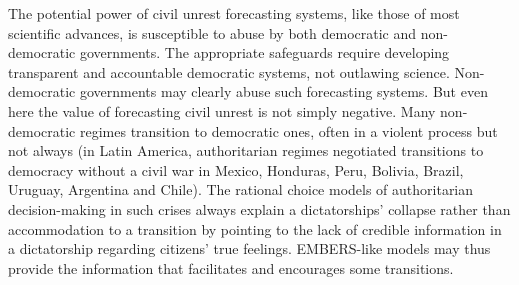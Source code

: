 The potential power of civil unrest forecasting systems, like those
of most scientific advances, is susceptible to abuse by
both democratic and non-democratic governments. The appropriate safeguards require
developing transparent and accountable democratic systems, not outlawing science.
Non-democratic governments may clearly abuse such forecasting systems. But even
here the value of forecasting civil unrest is not simply negative. Many non-democratic regimes transition to democratic
ones, often in a violent process but not always (in Latin America, authoritarian regimes negotiated
transitions to democracy without a civil war in Mexico, Honduras, Peru, Bolivia, Brazil,
Uruguay, Argentina and Chile). The rational choice models of authoritarian decision-making in
such crises always explain a dictatorships’ collapse rather than accommodation to
a transition by pointing to the lack of credible information in
a dictatorship regarding citizens’ true feelings. EMBERS-like models may thus provide the
information that facilitates and encourages some transitions.

